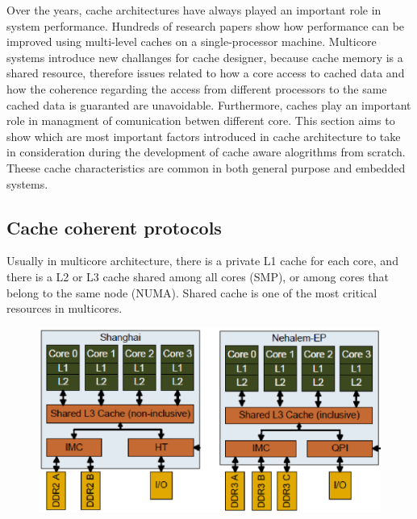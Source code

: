 Over the years, cache architectures have always played an important role in system performance. Hundreds of research papers show how performance
can be improved using multi-level caches on a single-processor machine. Multicore systems introduce new challanges for cache designer, because cache memory 
is a shared resource, therefore issues related to how a core access to cached data and how the coherence regarding the access from different processors 
to the same cached data is guaranted are unavoidable. Furthermore, caches play an important role in managment of comunication betwen different core.
This section aims to show which are most important factors introduced in cache architecture to take in consideration during the development of cache aware
alogrithms from scratch. Theese cache characteristics are common in both general purpose and embedded systems.

\subsection{Cache coherent protocols}

Usually in multicore architecture, there is a private L1 cache for each core, and there is a L2 or L3 cache shared among all cores (SMP), or among cores 
that belong to the same node (NUMA). Shared cache is one of the most critical resources in multicores.

\begin{figure}[htbp]
\centering
\includegraphics[width=\widefigure]{images/neh_amd.eps}
\caption{}
\label{fig:neh_amd}
\end{figure}

